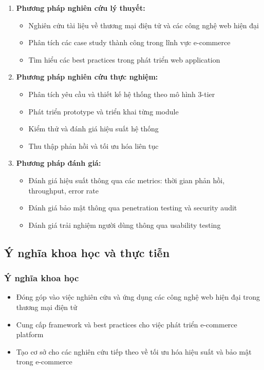 \documentclass[a4paper,12pt]{report}
\begin{document}
\begin{enumerate}
    \item \textbf{Phương pháp nghiên cứu lý thuyết:}
    \begin{itemize}
        \item Nghiên cứu tài liệu về thương mại điện tử và các công nghệ web hiện đại
        \item Phân tích các case study thành công trong lĩnh vực e-commerce
        \item Tìm hiểu các best practices trong phát triển web application
    \end{itemize}
    
    \item \textbf{Phương pháp nghiên cứu thực nghiệm:}
    \begin{itemize}
        \item Phân tích yêu cầu và thiết kế hệ thống theo mô hình 3-tier
        \item Phát triển prototype và triển khai từng module
        \item Kiểm thử và đánh giá hiệu suất hệ thống
        \item Thu thập phản hồi và tối ưu hóa liên tục
    \end{itemize}
    
    \item \textbf{Phương pháp đánh giá:}
    \begin{itemize}
        \item Đánh giá hiệu suất thông qua các metrics: thời gian phản hồi, throughput, error rate
        \item Đánh giá bảo mật thông qua penetration testing và security audit
        \item Đánh giá trải nghiệm người dùng thông qua usability testing
    \end{itemize}
\end{enumerate}

\subsection*{Ý nghĩa khoa học và thực tiễn}

\subsubsection*{Ý nghĩa khoa học}
\begin{itemize}
    \item Đóng góp vào việc nghiên cứu và ứng dụng các công nghệ web hiện đại trong thương mại điện tử
    \item Cung cấp framework và best practices cho việc phát triển e-commerce platform
    \item Tạo cơ sở cho các nghiên cứu tiếp theo về tối ưu hóa hiệu suất và bảo mật trong e-commerce
\end{itemize}
\end{document}
